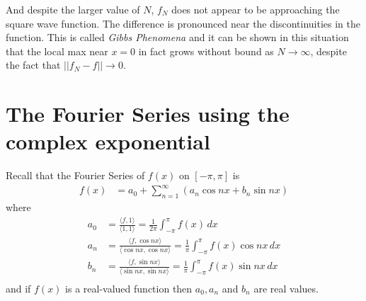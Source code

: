 And despite the larger value of $N$, $f_N$ does not appear to be approaching the square wave function.  The difference is pronounced near the discontinuities in the function.  This is called \emph{Gibbs Phenomena} and it can be shown in this situation that the local max near $x=0$ in fact grows without bound as $N \rightarrow \infty$, despite the fact that $||f_N-f|| \rightarrow 0$.  

\section{The Fourier Series using the complex exponential}

Recall that the Fourier Series of $f(x)$ on $[-\pi,\pi]$ is
%
\begin{align*}
f(x) & = a_0 + \sum_{n=1}^{\infty} (a_n \cos n x + b_n \sin n x)
\end{align*}
where 
%
\begin{align*}
a_0 & = \frac{\langle f,1 \rangle}{\langle 1,1 \rangle} = \frac{1}{2\pi} \int_{-\pi}^{\pi} f(x) \,dx \\
a_n & = \frac{\langle f, \cos nx \rangle}{\langle \cos nx, \cos nx \rangle} = \frac{1}{\pi} \int_{-\pi}^{\pi} f(x) \cos nx \,dx \\
b_n & =\frac{\langle f,\sin nx \rangle}{\langle \sin nx, \sin nx \rangle} =  \frac{1}{\pi} \int_{-\pi}^{\pi} f(x) \sin n x \,dx \\
\end{align*}
and if $f(x)$ is a real-valued function then $a_0, a_n$ and $b_n$ are real values. 

